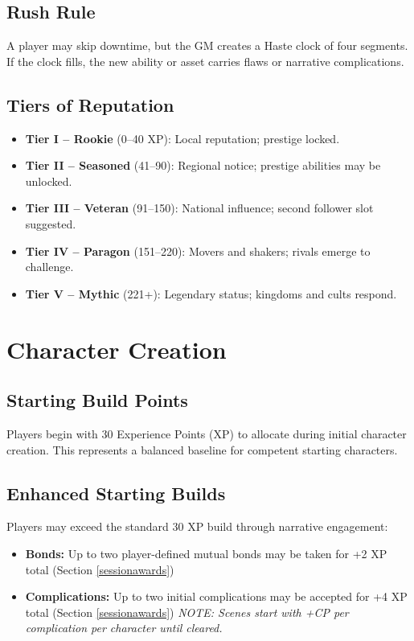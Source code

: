 \documentclass[11pt]{article}
\begin{document}
\subsection{Rush Rule}
A player may skip downtime, but the GM creates a Haste clock of four segments. If the clock fills, the new ability or asset carries flaws or narrative complications.

\subsection{Tiers of Reputation}
\begin{itemize}
    \item \textbf{Tier I – Rookie} (0–40 XP): Local reputation; prestige locked.
    \item \textbf{Tier II – Seasoned} (41–90): Regional notice; prestige abilities may be unlocked.
    \item \textbf{Tier III – Veteran} (91–150): National influence; second follower slot suggested.
    \item \textbf{Tier IV – Paragon} (151–220): Movers and shakers; rivals emerge to challenge.
    \item \textbf{Tier V – Mythic} (221+): Legendary status; kingdoms and cults respond.
\end{itemize}

\section{Character Creation}
\subsection{Starting Build Points}
Players begin with 30 Experience Points (XP) to allocate during initial character creation. This represents a balanced baseline for competent starting characters.

\subsection{Enhanced Starting Builds}
Players may exceed the standard 30 XP build through narrative engagement:

\begin{itemize}
    \item \textbf{Bonds:} Up to two player-defined mutual bonds may be taken for +2 XP total (Section \ref{sessionawards})
    \item \textbf{Complications:} Up to two initial complications may be accepted for +4 XP total (Section \ref{sessionawards}) \textit{NOTE: Scenes start with +CP per complication per character until cleared.}
\end{itemize}
\end{document}
